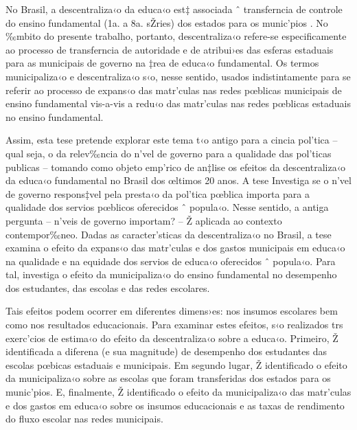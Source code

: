 \documentclass[a4paper, 12pt]{article}
\begin{document}
No Brasil, a descentraliza‹o da educa‹o est‡ associada ˆ transferncia de controle do ensino fundamental (1a. a 8a. sŽries)  dos estados para os munic’pios \cite{araujo_municipio_2005}. No ‰mbito do presente trabalho, portanto, descentraliza‹o refere-se especificamente ao processo de transferncia de autoridade e de atribui›es das esferas estaduais para as municipais de governo na ‡rea de educa‹o fundamental. Os termos municipaliza‹o e descentraliza‹o s‹o, nesse sentido, usados indistintamente para se referir ao processo de expans‹o das matr’culas nas redes pœblicas municipais de ensino fundamental vis-a-vis a redu‹o das matr’culas nas redes pœblicas estaduais no ensino fundamental.

Assim, esta tese pretende explorar este tema t‹o antigo para a cincia pol’tica -- qual seja, o da relev‰ncia do n’vel de governo para a qualidade das pol’ticas publicas -- tomando como objeto emp’rico de an‡lise os efeitos da descentraliza‹o  da educa‹o fundamental no Brasil dos œltimos 20 anos. A tese Investiga se o n’vel de governo respons‡vel pela presta‹o da pol’tica pœblica importa para a qualidade dos servios pœblicos oferecidos ˆ popula‹o.  Nesse sentido, a antiga pergunta -- n’veis de governo importam? -- Ž aplicada ao contexto contempor‰neo.  Dadas as caracter’sticas da descentraliza‹o no Brasil, a tese examina o efeito da expans‹o das matr’culas e dos gastos municipais em educa‹o na qualidade e na equidade dos servios de educa‹o oferecidos ˆ popula‹o. Para tal, investiga o efeito da municipaliza‹o do ensino fundamental no desempenho dos estudantes, das escolas e das redes escolares. 
 
Tais efeitos podem ocorrer em diferentes dimens›es: nos insumos escolares bem como nos resultados educacionais.  Para examinar estes efeitos, s‹o realizados trs exerc’cios de estima‹o do efeito da descentraliza‹o sobre a educa‹o. Primeiro,  Ž identificada a diferena (e sua magnitude) de desempenho dos estudantes das escolas pœbicas estaduais e municipais. Em segundo lugar, Ž identificado o efeito da municipaliza‹o sobre as escolas que foram transferidas dos estados para os munic’pios. E, finalmente, Ž identificado o efeito da municipaliza‹o das matr’culas e dos gastos em educa‹o sobre os insumos educacionais e as taxas de rendimento do fluxo escolar nas redes municipais.
\end{document}
